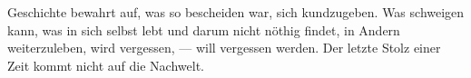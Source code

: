 Geschichte bewahrt auf, was so bescheiden war, sich kundzugeben. Was schweigen kann, was in sich selbst lebt und darum nicht nöthig findet, in Andern weiterzuleben, wird vergessen, — will vergessen werden. Der letzte Stolz einer Zeit kommt nicht auf die Nachwelt.
\par

